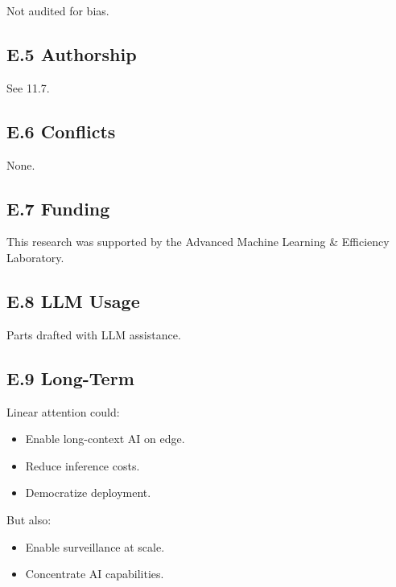 Not audited for bias.

\subsection{E.5 Authorship}

See  11.7.

\subsection{E.6 Conflicts}

None.

\subsection{E.7 Funding}

This research was supported by the Advanced Machine Learning \& Efficiency Laboratory.

\subsection{E.8 LLM Usage}

Parts drafted with LLM assistance.

\subsection{E.9 Long-Term}

Linear attention could:
\begin{itemize}
\item Enable long-context AI on edge.
\item Reduce inference costs.
\item Democratize deployment.

\end{itemize}
But also:
\begin{itemize}
\item Enable surveillance at scale.
\item Concentrate AI capabilities.

\end{itemize}
